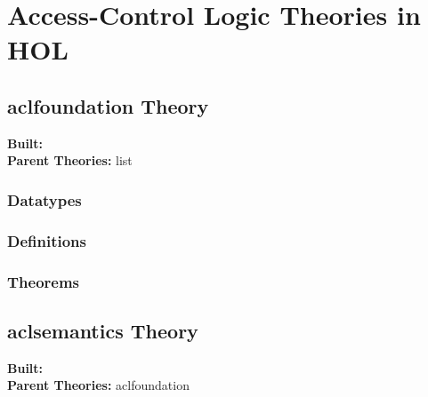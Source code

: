 \chapter{Access-Control Logic Theories in HOL}
\label{cha:acl-hol-reports}

% 
% 
% 
% 

\section{aclfoundation Theory}
\begin{flushleft}
\textbf{Built:} \HOLaclfoundationDate \\[2pt]
\textbf{Parent Theories:} list
\end{flushleft}

\subsection{Datatypes}

\HOLaclfoundationDatatypes

\subsection{Definitions}

\HOLaclfoundationDefinitions

\subsection{Theorems}

\HOLaclfoundationTheorems

\section{aclsemantics Theory}
\begin{flushleft}
\textbf{Built:} \HOLaclsemanticsDate \\[2pt]
\textbf{Parent Theories:} aclfoundation
\end{flushleft}

